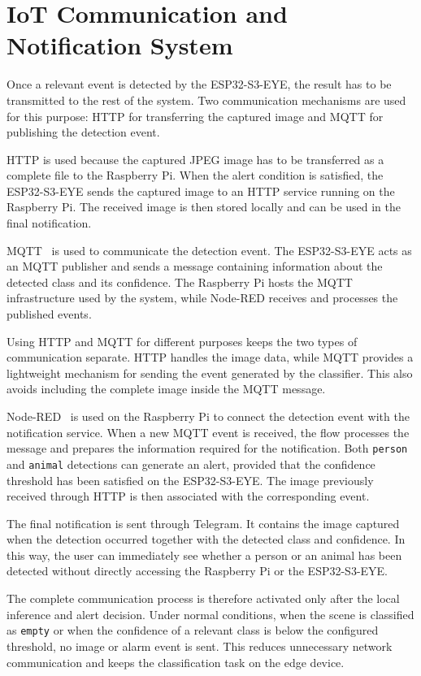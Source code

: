 \documentclass{article}
\begin{document}
\section{IoT Communication and Notification System}
\label{sec:iot-communication}

Once a relevant event is detected by the ESP32-S3-EYE, the result has to be
transmitted to the rest of the system. Two communication mechanisms are used
for this purpose: HTTP for transferring the captured image and MQTT for
publishing the detection event.

HTTP is used because the captured JPEG image has to be transferred as a
complete file to the Raspberry Pi. When the alert condition is satisfied,
the ESP32-S3-EYE sends the captured image to an HTTP service running on the
Raspberry Pi. The received image is then stored locally and can be used in
the final notification.

MQTT~\cite{mqtt2019} is used to communicate the detection event. The
ESP32-S3-EYE acts as an MQTT publisher and sends a message containing
information about the detected class and its confidence. The Raspberry Pi
hosts the MQTT infrastructure used by the system, while Node-RED receives
and processes the published events.

Using HTTP and MQTT for different purposes keeps the two types of
communication separate. HTTP handles the image data, while MQTT provides a
lightweight mechanism for sending the event generated by the classifier.
This also avoids including the complete image inside the MQTT message.

Node-RED~\cite{nodered} is used on the Raspberry Pi to connect the detection
event with the notification service. When a new MQTT event is received, the flow processes
the message and prepares the information required for the notification.
Both \texttt{person} and \texttt{animal} detections can generate an alert,
provided that the confidence threshold has been satisfied on the
ESP32-S3-EYE. The image previously received through HTTP is then associated
with the corresponding event.

The final notification is sent through Telegram. It contains the image
captured when the detection occurred together with the detected class and
confidence. In this way, the user can immediately see whether a person or
an animal has been detected without directly accessing the Raspberry Pi or
the ESP32-S3-EYE.

The complete communication process is therefore activated only after the
local inference and alert decision. Under normal conditions, when the scene
is classified as \texttt{empty} or when the confidence of a relevant class
is below the configured threshold, no image or alarm event is sent. This
reduces unnecessary network communication and keeps the classification task
on the edge device.
\end{document}
